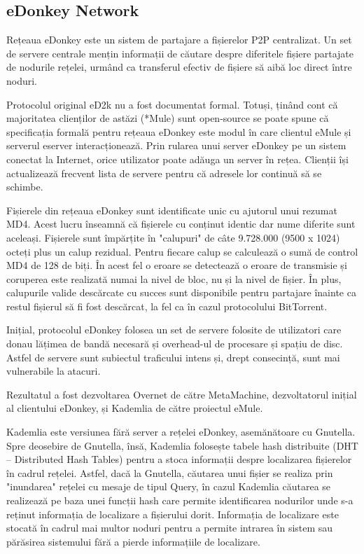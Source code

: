 \subsection{eDonkey Network}

Rețeaua eDonkey este un sistem de partajare a fișierelor P2P centralizat. Un
set de servere centrale mențin informații de căutare despre diferitele fișiere
partajate de nodurile rețelei, urmând ca transferul efectiv de fișiere să aibă
loc direct între noduri.

Protocolul original eD2k nu a fost documentat formal. Totuși, ținând cont că
majoritatea clienților de astăzi (*Mule) sunt open-source se poate spune că
specificația formală pentru rețeaua eDonkey este modul în care clientul eMule
și serverul eserver interacționează. Prin rularea unui server eDonkey pe un
sistem conectat la Internet, orice utilizator poate adăuga un server în rețea.
Clienții își actualizează frecvent lista de servere pentru că adresele lor
continuă să se schimbe.

Fișierele din rețeaua eDonkey sunt identificate unic cu ajutorul unui rezumat
MD4. Acest lucru înseamnă că fișierele cu conținut identic dar nume diferite
sunt aceleași. Fișierele sunt împărțite în "calupuri" de câte 9.728.000 (9500
x 1024) octeți plus un calup rezidual. Pentru fiecare calup se calculează o
sumă de control MD4 de 128 de biți. În acest fel o eroare se detectează o
eroare de transmisie și coruperea este realizată numai la nivel de bloc, nu și
la nivel de fișier. În plus, calupurile valide descărcate cu succes sunt
disponibile pentru partajare înainte ca restul fișierul să fi fost descărcat,
la fel ca în cazul protocolului BitTorrent.

Inițial, protocolul eDonkey folosea un set de servere folosite de utilizatori
care donau lățimea de bandă necesară și overhead-ul de procesare și spațiu de
disc. Astfel de servere sunt subiectul traficului intens și, drept consecință,
sunt mai vulnerabile la atacuri.

Rezultatul a fost dezvoltarea Overnet de către MetaMachine, dezvoltatorul
inițial al clientului eDonkey, și Kademlia de către proiectul eMule.

Kademlia este versiunea fără server a rețelei eDonkey, asemănătoare cu
Gnutella. Spre deosebire de Gnutella, însă, Kademlia folosește tabele hash
distribuite (DHT – Distributed Hash Tables) pentru a stoca informații despre
localizarea fișierelor în cadrul rețelei. Astfel, dacă la Gnutella, căutarea
unui fișier se realiza prin "inundarea" rețelei cu mesaje de tipul Query, în
cazul Kademlia căutarea se realizează pe baza unei funcții hash care permite
identificarea nodurilor unde s-a reținut informația de localizare a fișierului
dorit. Informația de localizare este stocată în cadrul mai multor noduri
pentru a permite intrarea în sistem sau părăsirea sistemului fără a pierde
informațiile de localizare.

